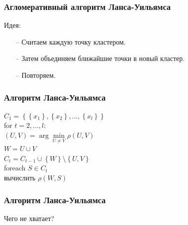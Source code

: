 \documentclass[12pt]{beamer}
\begin{document}
\begin{frame}\frametitle{Агломеративный алгоритм Ланса-Уильямса}
Идея:\\
\begin{itemize}
\item[--] Считаем каждую точку кластером. 
\item[--] Затем объединяем ближайшие точки в новый кластер. 
\item[--] Повторяем.
\end{itemize}
\end{frame}


\begin{frame}\frametitle{Алгоритм Ланса-Уильямса}

${C_1 = \left\{ \left\{ x_1\right\}, \left\{x_2 \right\}, \dots, \left\{x_l \right\} \right\}}$\\
for ${t=2, \dots, l }$:\\
\hspace{5mm} ${(U, V) = \arg\min\limits_{U \neq V} \rho(U, V)}$\\
\hspace{5mm} $W = U \cup V$\\
\hspace{5mm} ${C_t = C_{t-1} \cup \left\{ W \right\}\setminus \left\{U, V \right\} }$\\
\hspace{5mm} foreach ${S \in C_t}$\\
\hspace{10mm}   вычислить $\rho(W, S)$\\

\end{frame}


\begin{frame}\frametitle{Алгоритм Ланса-Уильямса}
Чего не хватает?
\end{frame}
\end{document}
